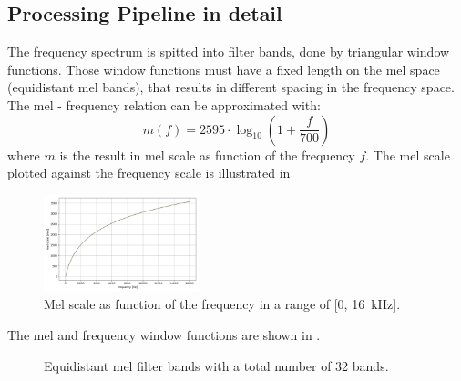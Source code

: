 \subsection{Processing Pipeline in detail}
The frequency spectrum is spitted into filter bands, done by triangular window functions.
Those window functions must have a fixed length on the mel space (equidistant mel bands), that results in different spacing in
the frequency space.
The mel - frequency relation can be approximated with:
\begin{equation}\label{eq:signal_mfcc_mel}
  m(f) = 2595 \cdot \log_{10} \left(1 + \frac{f}{700} \right) 
\end{equation}
where $m$ is the result in mel scale as function of the frequency $f$.
The mel scale plotted against the frequency scale is illustrated in 
\begin{figure}[!ht]
  \centering
  \includegraphics[width=0.40\textwidth]{./3_signal/figs/signal_mfcc_mel_scale}
  \caption{Mel scale as function of the frequency in a range of [0, \SI{16}{\kilo\hertz}].}
  \label{fig:signal_mfcc_mel_scale}
\end{figure}
\FloatBarrier
\noindent


The mel and frequency window functions are shown in .
\begin{figure}[!ht]
  \centering
  \quad
  \caption{Equidistant mel filter bands with a total number of 32 bands.}
  \label{fig:filter_bands}
\end{figure}
\FloatBarrier
\noindent

